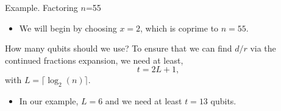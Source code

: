 	\begin{frame}{Example. Factoring $n$=55}
	\begin{itemize}
		\item We will begin by choosing $x=2$, which is coprime to $n=55$. 
	\end{itemize}
	
	\begin{block}{How many qubits should we use?}
	To ensure that we can find $d/r$ via the continued fractions expansion, we need at least,
	\begin{equation*}
		t=2L+1,
	\end{equation*}
	with $L=\lceil \log_2(n) \rceil$.
	\end{block}	
	
	\begin{itemize}
		\item In our example, $L=6$ and we need at least $t=13$ qubits.
	\end{itemize}
	
	
	\end{frame}